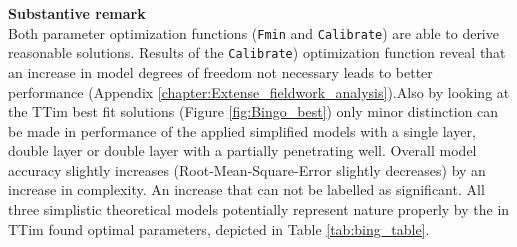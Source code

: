 \textbf{Substantive remark} \\
Both parameter optimization functions (\texttt{Fmin} and \texttt{Calibrate}) are able to derive reasonable solutions. Results of the \texttt{Calibrate}) optimization function reveal that an increase in model degrees of freedom not necessary leads to better performance (Appendix \ref{chapter:Extense_fieldwork_analysis}).Also by looking at the TTim best fit solutions (Figure \ref{fig:Bingo_best}) only minor distinction can be made in performance of the applied simplified models with a single layer, double layer or double layer with a partially penetrating well. Overall model accuracy slightly increases (Root-Mean-Square-Error slightly decreases) by an increase in complexity. An increase that can not be labelled as significant. All three simplistic theoretical models potentially represent nature properly by the in TTim found optimal parameters, depicted in Table \ref{tab:bing_table}.  


